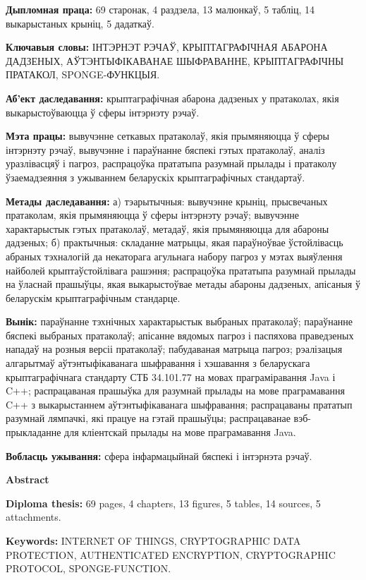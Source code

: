 \textbf{Дыпломная праца:} 69 старонак, 4 раздзела, 13 малюнкаў, 5 табліц, 14 выкарыстаных крыніц,
5 дадаткаў.

\textbf{Ключавыя словы:} ІНТЭРНЭТ РЭЧАЎ, КРЫПТАГРАФІЧНАЯ АБАРОНА ДАДЗЕНЫХ, АЎТЭНТЫФІКАВАНАЕ 
ШЫФРАВАННЕ, КРЫПТАГРАФІЧНЫ ПРАТАКОЛ, SPONGE-ФУНКЦЫЯ.

\textbf{Аб'ект даследавання:} крыптаграфічная абарона дадзеных у пратаколах, якія выкарыстоўваюцца 
ў сферы інтэрнэту рэчаў.

\textbf{Мэта працы:} вывучэнне сеткавых пратаколаў, якія прымяняюцца ў сферы інтэрнэту рэчаў, вывучэнне 
і параўнанне бяспекі гэтых пратаколаў, аналіз уразлівасцяў і пагроз, распрацоўка прататыпа разумнай прылады 
і пратаколу ўзаемадзеяння з ужываннем беларускіх крыптаграфічных стандартаў.

\textbf{Метады даследавання:} а) тэарытычныя: вывучэнне крыніц, прысвечаных пратаколам, якія прымяняюцца 
ў сферы інтэрнэту рэчаў; вывучэнне характарыстык гэтых пратаколаў, метадаў, якія прымяняюцца для абароны 
дадзеных; б) практычныя: складанне матрыцы, якая параўноўвае ўстойлівасць абраных тэхналогій да некаторага 
агульнага набору пагроз у мэтах выяўлення найболей крыптаўстойлівага рашэння; распрацоўка прататыпа 
разумнай прылады на ўласнай прашыўцы, якая выкарыстоўвае метады абароны дадзеных, апісаныя ў беларускім 
крыптаграфічным стандарце.

\textbf{Вынік:} параўнанне тэхнічных характарыстык выбраных пратаколаў; параўнанне бяспекі выбраных пратаколаў; 
апісанне вядомых пагроз і паспяхова праведзеных нападаў на розныя версіі пратаколаў; пабудаваная матрыца пагроз; 
рэалізацыя алгарытмаў аўтэнтыфікаванага шыфравання і хэшавання з беларускага крыптаграфічнага стандарту 
СТБ 34.101.77 на мовах праграміравання Java і C++; распрацаваная прашыўка для разумнай прылады на мове 
праграмавання C++ з выкарыстаннем аўтэнтыфікаванага шыфравання; распрацаваны прататып разумнай лямпачкі, 
які працуе на гэтай прашыўцы; распрацаванае вэб-прыкладанне для кліентскай прылады на мове праграмавання Java.

\textbf{Вобласць ужывання:} сфера інфармацыйнай бяспекі і інтэрнэта рэчаў.


\newpage
\begin{center}{\bf \Large Abstract}\end{center}

\textbf{Diploma thesis:} 69 pages, 4 chapters, 13 figures, 5 tables, 14 sources, 5 attachments.

\textbf{Keywords:} INTERNET OF THINGS, CRYPTOGRAPHIC DATA \newline PROTECTION, 
AUTHENTICATED ENCRYPTION, CRYPTOGRAPHIC PROTOCOL, SPONGE-FUNCTION.

